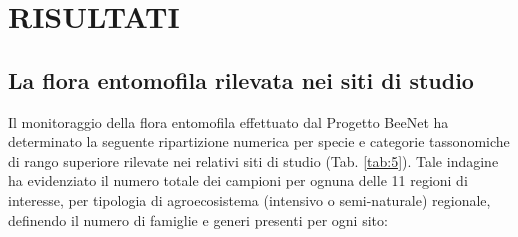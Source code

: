\documentclass[main.tex]{subfiles}
\begin{document}
\section{RISULTATI}
\subsection{La flora entomofila rilevata nei siti di studio}

Il monitoraggio della flora entomofila effettuato dal Progetto BeeNet ha determinato la seguente ripartizione numerica per specie e categorie tassonomiche di rango superiore rilevate nei relativi siti di studio (Tab. \ref{tab:5}). Tale indagine ha evidenziato il numero totale dei campioni per ognuna delle 11 regioni di interesse, per tipologia di agroecosistema (intensivo o semi-naturale) regionale, definendo il numero di famiglie e generi presenti per ogni sito:
\end{document}
